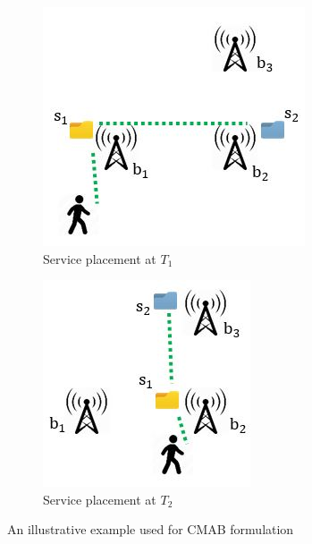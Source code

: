 \begin{figure}[t]
	\centering
	\begin{subfigure}[b]{.48\linewidth}
		\includegraphics[width=0.7\linewidth]{figs/example_before.JPG}
		\caption{Service placement at $T_1$}
		\label{fig:alg_example_before}
	\end{subfigure}
	\hfill
	\begin{subfigure}[b]{.48\linewidth}
		\includegraphics[width=0.7\linewidth]{figs/example_after.JPG}
		\caption{Service placement at $T_2$}
		\label{fig:alg_example_after}
	\end{subfigure}
	\vspace{\baselineskip}
	\caption{An illustrative example used for CMAB formulation}
	
	\label{fig:algo_example}
\end{figure}

